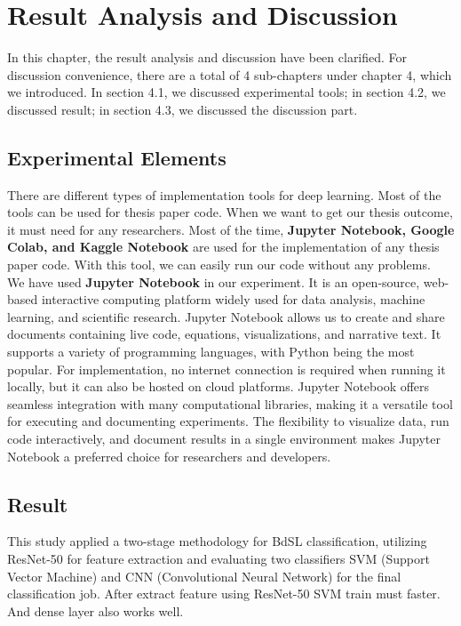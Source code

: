 %
%
\let\textcircled=\pgftextcircled
\chapter{Result Analysis and Discussion}
\label{chap:implementation}
In this chapter, the result analysis and discussion have been clarified. For discussion convenience, there are a total of 4 sub-chapters under chapter 4, which we introduced. In section 4.1, we discussed experimental tools; in section 4.2, we discussed result; in section 4.3, we discussed the discussion part.

\vspace{150mm}

\section{Experimental Elements}
\label{sec:sec4_1}
There are different types of implementation tools for deep learning. Most of the tools can be used for thesis paper code. When we want to get our thesis outcome, it must need for any researchers. Most of the time, \textbf{Jupyter Notebook, Google Colab, and Kaggle Notebook} are used for the implementation of any thesis paper code. With this tool, we can easily run our code without any problems.\\

We have used \textbf{Jupyter Notebook} in our experiment. It is an open-source, web-based interactive computing platform widely used for data analysis, machine learning, and scientific research. Jupyter Notebook allows us to create and share documents containing live code, equations, visualizations, and narrative text. It supports a variety of programming languages, with Python being the most popular. For implementation, no internet connection is required when running it locally, but it can also be hosted on cloud platforms. Jupyter Notebook offers seamless integration with many computational libraries, making it a versatile tool for executing and documenting experiments. The flexibility to visualize data, run code interactively, and document results in a single environment makes Jupyter Notebook a preferred choice for researchers and developers.

\section{Result}
\label{sec:sec4_2}
This study applied a two-stage methodology for BdSL classification, utilizing ResNet-50 for feature extraction and evaluating two classifiers SVM (Support Vector Machine) and CNN (Convolutional Neural Network) for the final classification job. After extract feature using ResNet-50 SVM train must faster. And dense layer also works well.

